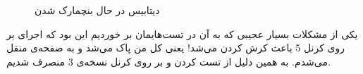 \begin{figure}[H]
    \caption{دیتابیس در حال بنچمارک شدن}
    \label{fig:postgres:baremetal:database:benchmark}
\end{figure}

یکی از مشکلات بسیار عجیبی که به آن در تست‌هایمان بر خوردیم این بود که اجرای
بر روی کرنل 5 باعث کرش کردن
می‌شد! یعنی کل
من پاک می‌شد و به صفحه‌ی
منقل می‌شدم. به همین دلیل از تست کردن
 و 
بر روی کرنل نسخه‌ی 3 منصرف شدیم.
